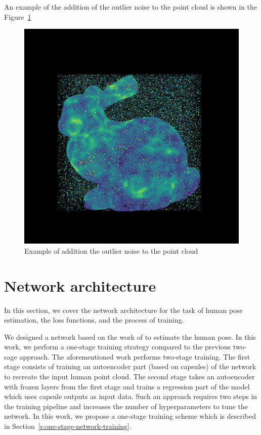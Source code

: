 An example of the addition of the outlier noise to the point cloud is shown in the Figure~\ref{img:outlier-noise}

\begin{figure}[htbp]
    \centerline{\includegraphics[scale=.6]{Figures/coords_outlier.png}}
    \caption{Example of addition the outlier noise to the point cloud \parencite{uchida_tom-uchidaadd_noise_to_point_cloud_2021}}
    \label{img:outlier-noise}
\end{figure}

\section{Network architecture}
\label{Network architecture}

In this section, we cover the network architecture for the task of human pose estimation, the loss functions, and the process of training.

We designed a network based on the work of \cite{wu_3d_2020} to estimate the human pose. In this work, we perform a one-stage training strategy compared to the previous two-sage approach. The aforementioned work performs two-stage training. The first stage consists of training an autoencoder part (based on capsules) of the network to recreate the input human point cloud. The second stage takes an autoencoder with frozen layers from the first stage and trains a regression part of the model which uses capsule outputs as input data. Such an approach requires two steps in the training pipeline and increases the number of hyperparameters to tune the network. In this work, we propose a one-stage training scheme which is described in Section~\ref{s:one-stage-network-training}.

